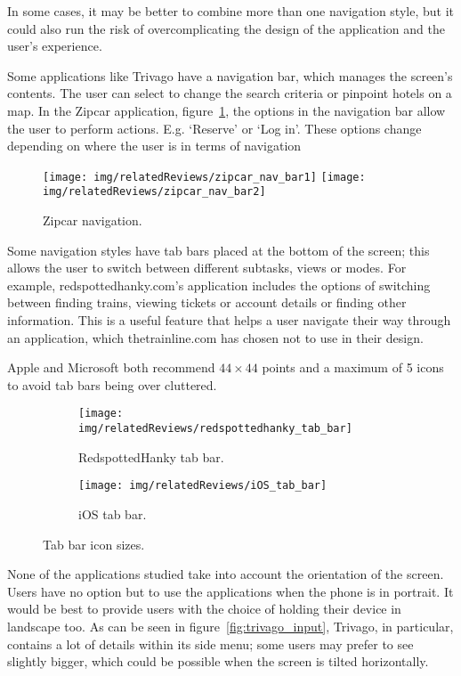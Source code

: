 In some cases, it may be better to combine more than one navigation style, but
it could also run the risk of overcomplicating the design of the application
and the user's experience.

Some applications like Trivago have a navigation bar, which manages the
screen's contents. The user can select to change the search criteria or
pinpoint hotels on a map. In the Zipcar application,
figure~\ref{fig:zipcar_nav_bar}, the options in the navigation bar allow the
user to perform actions. E.g. `Reserve' or `Log in'. These options change
depending on where the user is in terms of navigation
\begin{figure}[htbp]
	\begin{center}
		\texttt{[image: img/relatedReviews/zipcar\_nav\_bar1]}
		\quad
		\texttt{[image: img/relatedReviews/zipcar\_nav\_bar2]}
	\end{center}
	\caption{Zipcar navigation\cite{ZipCarIOS}.}\label{fig:zipcar_nav_bar}
\end{figure}

Some navigation styles have tab bars placed at the bottom of the screen; this
allows the user to switch between different subtasks, views or modes. For
example, redspottedhanky.com's application includes the options of switching
between finding trains, viewing tickets or account details or finding other
information. This is a useful feature that helps a user navigate their way
through an application, which thetrainline.com has chosen not to use in their
design.

Apple and Microsoft both recommend $44\times44$ points and a maximum of 5 icons
to avoid tab bars being over cluttered.
\begin{figure}[htbp]
	\centering
	\begin{subfigure}[b]{0.35\textwidth}
		\texttt{[image: img/relatedReviews/redspottedhanky\_tab\_bar]}
		\caption{RedspottedHanky tab bar. }\label{fig:redspottedhanky_tab_bar}
	\end{subfigure}%
	\qquad
	\begin{subfigure}[b]{0.4\textwidth}
		\texttt{[image: img/relatedReviews/iOS\_tab\_bar]}
		\caption{iOS tab bar.}\label{fig:iOS_tab_bar}
	\end{subfigure}
	\caption{Tab bar icon sizes.}
\end{figure}

None of the applications studied take into account the orientation of the
screen. Users have no option but to use the applications when the phone is in
portrait. It would be best to provide users with the choice of holding their
device in landscape too.  As can be seen in figure~\ref{fig:trivago_input},
Trivago, in particular, contains a lot of details within its side menu; some
users may prefer to see slightly bigger, which could be possible when the
screen is tilted horizontally.

